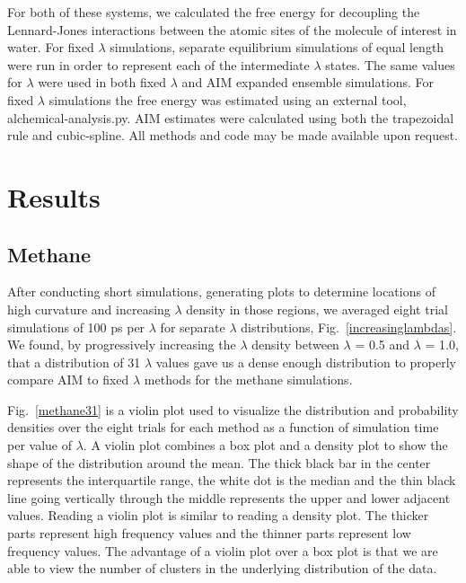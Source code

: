 \documentclass[fleqn,10pt,lineno]{wlpeerj} %
\begin{document}
For both of these systems, we calculated the free energy for decoupling the Lennard-Jones interactions between the atomic sites of the molecule of interest in water. For fixed $\lambda$ simulations, separate equilibrium simulations of equal length were run in order to represent each of the intermediate $\lambda$ states. The same values for $\lambda$ were used in both fixed $\lambda$ and AIM expanded ensemble simulations. For fixed $\lambda$ simulations the free energy was estimated using an external tool, alchemical-analysis.py. AIM estimates were calculated using both the trapezoidal rule and cubic-spline. All methods and code may be made available upon request.

\section*{Results} \label{results} 

\subsection*{Methane} \label{res:methane}

After conducting short simulations, generating plots to determine locations of high curvature and increasing $\lambda$ density in those regions, we averaged eight trial simulations of 100 ps per $\lambda$ for separate $\lambda$ distributions, Fig.\ \ref{increasinglambdas}. We found, by progressively increasing the $\lambda$ density between $\lambda$ = 0.5 and $\lambda$ = 1.0, that a distribution of 31 $\lambda$ values gave us a dense enough distribution to properly compare AIM to fixed $\lambda$ methods for the methane simulations.

Fig.\ \ref{methane31} is a violin plot used to visualize the distribution and probability densities over the eight trials for each method as a function of simulation time per value of $\lambda$. A violin plot combines a box plot and a density plot to show the shape of the distribution around the mean. The thick black bar in the center represents the interquartile range, the white dot is the median and the thin black line going vertically through the middle represents the upper and lower adjacent values. Reading a violin plot is similar to reading a density plot. The thicker parts represent high frequency values and the thinner parts represent low frequency values. The advantage of a violin plot over a box plot is that we are able to view the number of clusters in the underlying distribution of the data.
\end{document}
